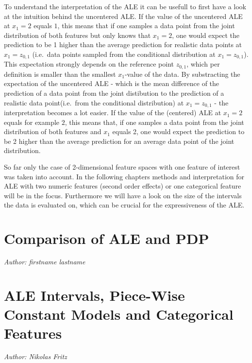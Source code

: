 \documentclass[
]{krantz}
\begin{document}
To understand the interpretation of the ALE it can be usefull to first have a look at the intuition behind the uncentered ALE.
If the value of the uncentered ALE at \(x_1 = 2\) equals \(1\), this means that if one samples a data point from the joint distribution of both features but only knows that \(x_1 = 2\), one would expect the prediction to be 1 higher than the average prediction for realistic data points at \(x_1 = z_{0,1}\) (i.e.~data points sampled from the conditional distribution at \(x_1 = z_{0,1}\)). This expectation strongly depends on the reference point \(z_{0,1}\), which per definition is smaller than the smallest \(x_1\)-value of the data.
By substracting the expectation of the uncentered ALE - which is the mean difference of the prediction of a data point from the joint distibution to the prediction of a realistic data point(i.e.~from the conditional distribution) at \(x_1 = z_{0,1}\) - the interpretation becomes a lot easier. If the value of the (centered) ALE at \(x_1 = 2\) equals for example \(2\), this means that, if one samples a data point from the joint distribution of both features and \(x_1\) equals 2, one would expect the prediction to be 2 higher than the average prediction for an average data point of the joint distribution.

So far only the case of 2-dimensional feature spaces with one feature of interest was taken into account. In the following chapters methods and interpretation for ALE with two numeric features (second order effects) or one categorical feature will be in the focus. Furthermore we will have a look on the size of the intervals the data is evaluated on, which can be crucial for the expressiveness of the ALE.

\hypertarget{comparison-of-ale-and-pdp}{%
\chapter{Comparison of ALE and PDP}\label{comparison-of-ale-and-pdp}}

\emph{Author: firstname lastname}

\hypertarget{ale-intervals-piece-wise-constant-models-and-categorical-features}{%
\chapter{ALE Intervals, Piece-Wise Constant Models and Categorical Features}\label{ale-intervals-piece-wise-constant-models-and-categorical-features}}

\emph{Author: Nikolas Fritz}
\end{document}
